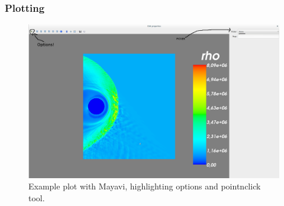 \documentclass{beamer}
\begin{document}
\begin{frame}[fragile]
 \frametitle{Plotting}
 \begin{center}
 \end{center}
 \begin{figure}
  \centering
  \includegraphics[width=\textwidth]{../images/none.png}
  \caption{\tiny{Example plot with Mayavi, highlighting options and pointnclick tool.}}
  \label{fig:mayavi_example}
 \end{figure}
\end{frame}
\end{document}
